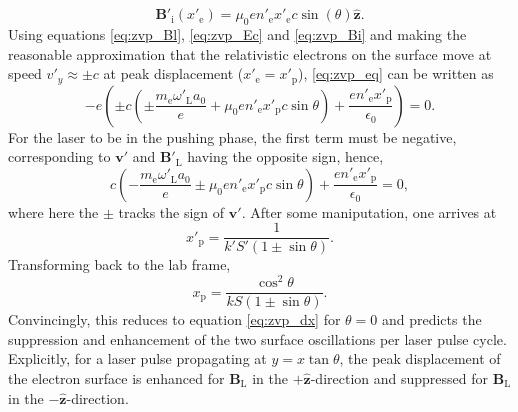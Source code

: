 \begin{equation}\label{eq:zvp_Bi}
	\mathbf{B}'_\mathrm{i}(x'_\mathrm{e}) = \mu_0 en'_\mathrm{e}x'_\mathrm{e}c\sin(\theta)\hat{\mathbf{z}}.
\end{equation}
Using equations \ref{eq:zvp_Bl}, \ref{eq:zvp_Ec} and \ref{eq:zvp_Bi} and making the reasonable approximation that the relativistic electrons on the surface move at speed $v'_y \approx \pm c$ at peak displacement ($x'_\mathrm{e} = x'_\mathrm{p}$), \ref{eq:zvp_eq} can be written as
\begin{equation}
	-e\left(\pm c\left(\pm\frac{m_\mathrm{e}\omega'_\mathrm{L}a_0}{e} + \mu_0 en'_\mathrm{e} x'_\mathrm{p}c\sin\theta\right)+\frac{en'_\mathrm{e}x'_\mathrm{p}}{\epsilon_0}\right) = 0.
\end{equation}
For the laser to be in the pushing phase, the first term must be negative, corresponding to $\mathbf{v'}$ and $\mathbf{B}'_\mathrm{L}$ having the opposite sign, hence,
\begin{equation}
	 c\left(-\frac{m_\mathrm{e}\omega'_\mathrm{L}a_0}{e} \pm \mu_0 en'_\mathrm{e} x'_\mathrm{p}c\sin\theta\right)+\frac{en'_\mathrm{e}x'_\mathrm{p}}{\epsilon_0} = 0,
\end{equation}
where here the $\pm$ tracks the sign of $\mathbf{v}'$. After some maniputation, one arrives at
\begin{equation}
	x'_\mathrm{p} = \frac{1}{k'S' (1\pm \sin\theta)}.
\end{equation}
Transforming back to the lab frame,
\begin{equation}
	x_\mathrm{p} = \frac{\cos^2\theta}{kS(1\pm \sin\theta)}.
\end{equation}
Convincingly, this reduces to equation \ref{eq:zvp_dx} for $\theta =0$ and predicts the suppression and enhancement of the two surface oscillations per laser pulse cycle. Explicitly, for a laser pulse propagating at $y = x\tan\theta$, the peak displacement of the electron surface is enhanced for $\mathbf{B}_\mathrm{L}$ in the $+\hat{\mathbf{z}}$-direction and suppressed for $\mathbf{B}_\mathrm{L}$ in the $-\hat{\mathbf{z}}$-direction.

